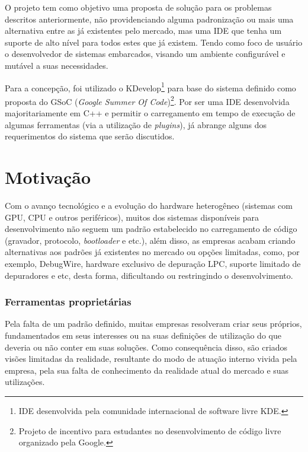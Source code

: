 O projeto tem como objetivo uma proposta de solução para os problemas descritos anteriormente, não providenciando alguma padronização ou mais uma alternativa entre as já existentes pelo mercado, mas uma IDE que tenha um suporte de alto nível para todos estes que já existem. Tendo como foco de usuário o desenvolvedor de sistemas embarcados, visando um ambiente configurável e mutável a suas necessidades.

Para a concepção, foi utilizado o KDevelop\footnote{IDE desenvolvida pela comunidade internacional de software livre KDE.} para base do sistema definido como proposta do GSoC (\textit{Google Summer Of Code})\footnote{Projeto de incentivo para estudantes no desenvolvimento de código livre organizado pela Google.}. Por ser uma IDE desenvolvida majoritariamente em C++ e permitir o carregamento em tempo de execução de algumas ferramentas (via a utilização de \textit{plugins}), já abrange alguns dos requerimentos do sistema que serão discutidos.

\section{Motivação}

Com o avanço tecnológico e a evolução do hardware heterogêneo (sistemas com GPU, CPU e outros periféricos), muitos dos sistemas disponíveis para desenvolvimento não seguem um padrão estabelecido no carregamento de código (gravador, protocolo, \textit{bootloader} e etc.), além disso, as empresas acabam criando alternativas aos padrões já
 existentes no mercado ou opções limitadas, como, por exemplo, DebugWire\cite{debugwire}, hardware exclusivo de depuração LPC\cite{nxp}, suporte limitado de depuradores\cite{kiledebug} e etc, desta forma, dificultando ou restringindo o desenvolvimento.

\subsubsection{Ferramentas proprietárias}

Pela falta de um padrão definido, muitas empresas resolveram criar seus próprios, fundamentados em seus interesses ou na suas definições de utilização do que deveria ou não conter em suas soluções. Como consequência disso, são criados visões limitadas da realidade, resultante do modo de atuação interno vivida pela empresa, pela sua falta de conhecimento da realidade atual do mercado e suas utilizações.

